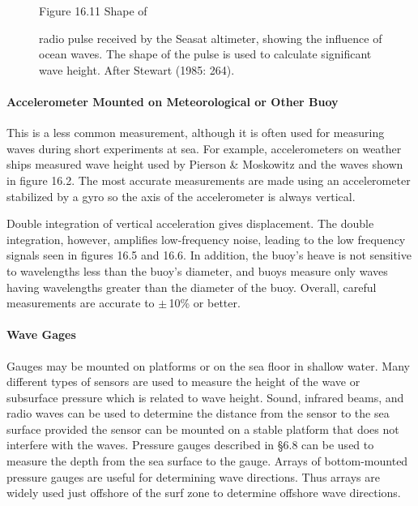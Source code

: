 \begin{figure}[t!]
\footnotesize
Figure 16.11 Shape of \rule{0mm}{4ex}radio pulse received by the
Seasat altimeter, showing the influence of ocean waves. The shape of
the pulse is used to calculate significant wave height. After Stewart
(1985: 264).
\label{fig:altimeterpulse}
\vspace{-3ex}
\end{figure}

\paragraph{Accelerometer Mounted on Meteorological or Other Buoy}
This is a less common measurement, although it is often used for
measuring waves during short experiments at sea. For example,
accelerometers on weather ships measured wave height used by Pierson
\& Moskowitz and the waves shown in figure 16.2. The most accurate
measurements are made using an accelerometer stabilized by a gyro so
the axis of the accelerometer is always vertical.

Double integration of vertical acceleration gives displacement. The
double integration, however, amplifies low-frequency noise, leading to
the low frequency signals seen in figures 16.5 and 16.6. In addition,
the buoy's heave is not sensitive to wavelengths less than the buoy's
diameter, and buoys measure only waves having wavelengths greater than
the diameter of the buoy. Overall, careful measurements are accurate
to $\pm \,$10\% or better.

\paragraph{Wave Gages}
Gauges may be mounted on platforms or on the sea floor in
shallow water. Many different types
of sensors are used to measure the height of the wave or subsurface
pressure which is related to wave height. Sound, infrared beams, and
radio waves can be used to determine the distance from the sensor to
the sea surface provided the sensor can be mounted on a stable
platform that does not interfere with the waves. Pressure gauges
described in \S 6.8 can be used to measure the depth from the sea
surface to the gauge. Arrays of bottom-mounted pressure gauges are
useful for determining wave directions. Thus arrays are widely used
just offshore of the surf zone to determine offshore wave directions.


